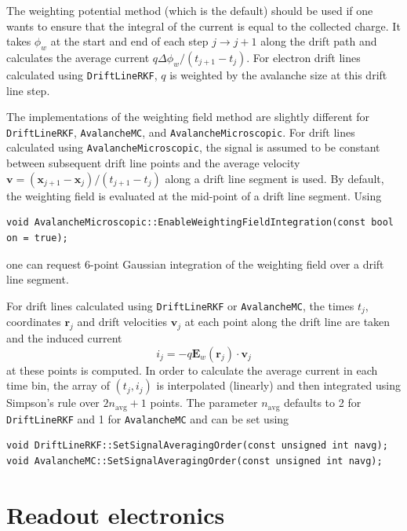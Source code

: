 The weighting potential method (which is the default) 
should be used if one wants to ensure that 
the integral of the current is equal to the collected charge.
It takes $\phi_{w}$ at the start and end of each step $j \rightarrow j + 1$ along the drift path
and calculates the average current $q\Delta\phi_{w}/\left(t_{j+1} - t_{j}\right)$. 
For electron drift lines calculated using \texttt{DriftLineRKF}, 
$q$ is weighted by the avalanche size at this drift line step.

The implementations of the weighting field method are slightly different 
for \texttt{DriftLineRKF}, \texttt{AvalancheMC}, and \texttt{AvalancheMicroscopic}.
For drift lines calculated using \texttt{AvalancheMicroscopic}, the signal 
is assumed to be constant between subsequent drift line points 
and the average velocity 
$\mathbf{v} = \left(\mathbf{x}_{j + 1} - \mathbf{x}_{j}\right) / \left(t_{j + 1} - t_{j}\right)$ along a drift line segment is used.
By default, the weighting field is evaluated at the mid-point of a 
drift line segment. 
Using 
\begin{lstlisting}
void AvalancheMicroscopic::EnableWeightingFieldIntegration(const bool on = true);
\end{lstlisting} 
one can request 6-point Gaussian integration of the weighting field 
over a drift line segment.

For drift lines calculated using \texttt{DriftLineRKF} or \texttt{AvalancheMC},
the times $t_j$, coordinates $\mathbf{r}_j$ and drift velocities $\mathbf{v}_j$
at each point along the drift line are taken and the induced current 
\begin{equation*}
  i_{j} = -q \mathbf{E}_{w}\left(\mathbf{r}_{j}\right) \cdot \mathbf{v}_j
\end{equation*}
at these points is computed. In order to calculate the average current 
in each time bin, the array of $\left(t_{j}, i_{j}\right)$ is interpolated 
(linearly) and then integrated using Simpson's rule over $2n_\text{avg} + 1$ points. The parameter $n_\text{avg}$ defaults to 2 for \texttt{DriftLineRKF} 
and 1 for \texttt{AvalancheMC} and can be set using
\begin{lstlisting}
void DriftLineRKF::SetSignalAveragingOrder(const unsigned int navg);
void AvalancheMC::SetSignalAveragingOrder(const unsigned int navg);
\end{lstlisting} 

\section{Readout electronics}

